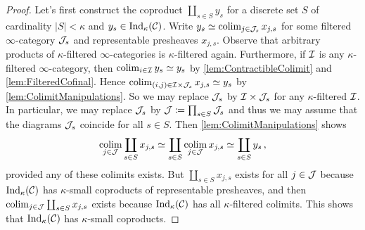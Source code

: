 \begin{proof}
	Let's first construct the coproduct $\coprod_{s\in S}y_s$ for a discrete set $S$ of cardinality $\left|S\right|<\kappa$ and $y_s\in\mathrm{Ind}_\kappa(\mathcal{C})$. Write $y_s\simeq \operatorname*{colim}_{j\in \mathcal{J}_s}x_{j,s}$ for some filtered $\infty$-category $\mathcal{J}_s$ and representable presheaves $x_{j,s}$. Observe that arbitrary products of $\kappa$-filtered $\infty$-categories is $\kappa$-filtered again. Furthermore, if $\mathcal{I}$ is any $\kappa$-filtered $\infty$-category, then $\operatorname*{colim}_{i\in\mathcal{I}}y_s\simeq y_s$ by \cref{lem:ContractibleColimit} and \cref{lem:FilteredCofinal}. Hence  $\operatorname*{colim}_{(i,j)\in \mathcal{I}\times\mathcal{J}_s}x_{j,s}\simeq y_s$ by \cref{lem:ColimitManipulations}. So we may replace $\mathcal{J}_s$ by $\mathcal{I}\times\mathcal{J}_s$ for any $\kappa$-filtered $\mathcal{I}$. In particular, we may replace $\mathcal{J}_s$ by $\mathcal{J}\coloneqq \prod_{s\in S}\mathcal{J}_s$ and thus we may assume that the diagrams $\mathcal{J}_s$ coincide for all $s\in S$. Then \cref{lem:ColimitManipulations} shows
	\begin{equation*}
		\operatorname*{colim}_{j\in\mathcal{J}}\coprod_{s\in S}x_{j,s}\simeq \coprod_{s\in S}\operatorname*{colim}_{j\in\mathcal{J}}x_{j,s}\simeq \coprod_{s\in S}y_s\,,
	\end{equation*}
	provided any of these colimits exists. But $\coprod_{s\in S}x_{j,s}$ exists for all $j\in \mathcal{J}$ because $\mathrm{Ind}_\kappa(\mathcal{C})$ has $\kappa$-small coproducts of representable presheaves, and then $\operatorname*{colim}_{j\in\mathcal{J}}\coprod_{s\in S}x_{j,s}$ exists because $\mathrm{Ind}_\kappa(\mathcal{C})$ has all $\kappa$-filtered colimits. This shows that $\mathrm{Ind}_\kappa(\mathcal{C})$ has $\kappa$-small coproducts.
	

\end{proof}
